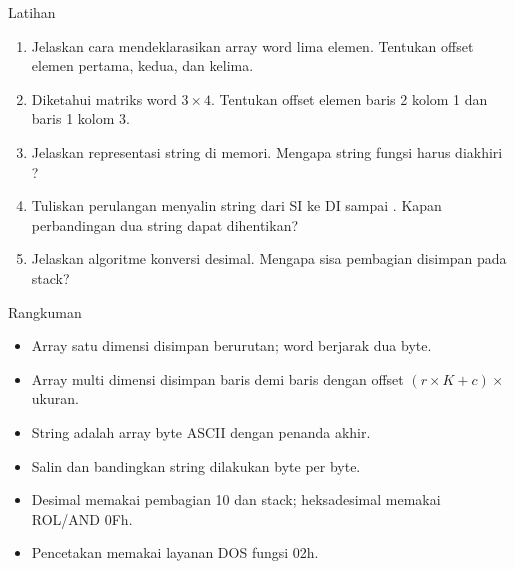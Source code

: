 \documentclass[aspectratio=169,11pt]{beamer}
\begin{document}
\begin{frame}{Latihan}
\small
\begin{enumerate}
    \item Jelaskan cara mendeklarasikan array word lima elemen.
          Tentukan offset elemen pertama, kedua, dan kelima.

    \vspace{0.15em}
    \item Diketahui matriks word $3 \times 4$. Tentukan offset
          elemen baris 2 kolom 1 dan baris 1 kolom 3.

    \vspace{0.15em}
    \item Jelaskan representasi string di memori. Mengapa string
          fungsi  harus diakhiri ?

    \vspace{0.15em}
    \item Tuliskan perulangan menyalin string dari SI ke DI sampai
          . Kapan perbandingan dua string dapat
          dihentikan?

    \vspace{0.15em}
    \item Jelaskan algoritme konversi desimal. Mengapa sisa
          pembagian disimpan pada stack?
\end{enumerate}
\end{frame}

\begin{frame}{Rangkuman}
\small
\begin{itemize}
    \item Array satu dimensi disimpan berurutan; word berjarak dua
          byte.

    \vspace{0.15em}
    \item Array multi dimensi disimpan baris demi baris dengan
          offset $(r \times K + c) \times$ ukuran.

    \vspace{0.15em}
    \item String adalah array byte ASCII dengan penanda akhir.

    \vspace{0.15em}
    \item Salin dan bandingkan string dilakukan byte per byte.

    \vspace{0.15em}
    \item Desimal memakai pembagian 10 dan stack; heksadesimal
          memakai ROL/AND 0Fh.

    \vspace{0.15em}
    \item Pencetakan memakai layanan DOS fungsi 02h.
\end{itemize}
\end{frame}
\end{document}
